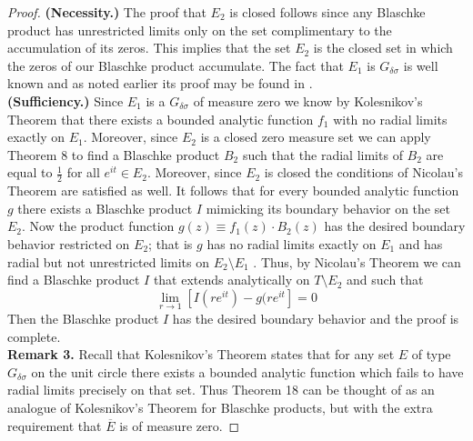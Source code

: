 \documentclass[12pt]{article}
\begin{document}
\begin{proof}\textbf{(Necessity.)}
The proof that $E_2$ is closed follows since any Blaschke product has unrestricted limits only on the set complimentary to the accumulation of its zeros. This implies that the set $E_2$ is the closed set in which the zeros of our Blaschke product accumulate. The fact that $E_1$ is $G_{\delta\sigma}$ is well known and as noted earlier its proof may be found in \cite{AL}. \\
\textbf{(Sufficiency.)}
Since $E_1$ is a $G_{\delta\sigma}$ of measure zero we know by {Kolesnikov's Theorem} that there exists a bounded analytic function $f_1$ with no radial limits exactly on $ E_1$. Moreover, since $E_2$ is a closed zero measure set we can apply {Theorem 8} to find a Blaschke product $B_2$ such that the radial limits of $B_2$ are equal to $\frac{1}{2}$ for all $e^{it}\in E_2$. Moreover, since $E_2$ is closed the conditions of Nicolau's Theorem are satisfied as well. It follows that for every bounded analytic function $g$ there exists a Blaschke product $I$ mimicking its boundary behavior on the set $E_2$. Now the product function $g(z)\equiv f_1(z)\cdot B_2(z)$ has the desired boundary behavior restricted on $E_2$; that is $g$ has no radial limits exactly on $E_1$ and has radial but not unrestricted limits on $E_2\setminus E_1$ . Thus, by Nicolau's Theorem we can find a Blaschke product $I$ that extends analytically on $T\setminus E_2$ and such that $$\lim_{r\rightarrow 1}[ I(re^{it})-g(re^{it}]=0$$
Then the Blaschke product $I$ has the desired boundary behavior and the proof is complete.\\

\noindent\textbf{Remark 3.}
\noindent Recall that {Kolesnikov's Theorem} states that for any set $E$ of type $G_{\delta\sigma}$ on the unit circle there exists a bounded analytic function which fails to have radial limits precisely on that set. Thus Theorem 18 can be thought of as an analogue of {Kolesnikov's Theorem} for Blaschke products, but with the extra requirement that $\overline{E}$ is of measure zero.




\end{proof}

 
\end{document}
